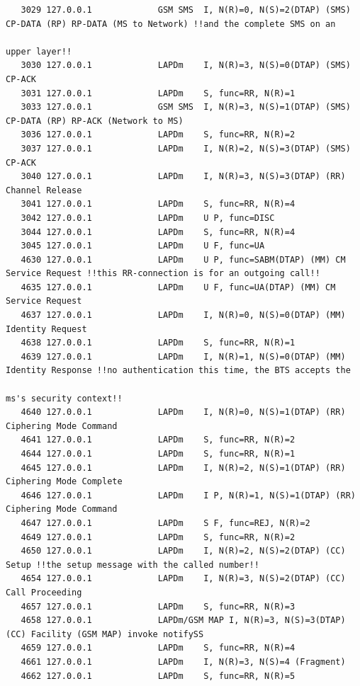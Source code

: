 \begin{lstlisting}
   3029 127.0.0.1             GSM SMS  I, N(R)=0, N(S)=2(DTAP) (SMS) CP-DATA (RP) RP-DATA (MS to Network) !!and the complete SMS on an
                                                                                                          upper layer!!
   3030 127.0.0.1             LAPDm    I, N(R)=3, N(S)=0(DTAP) (SMS) CP-ACK 
   3031 127.0.0.1             LAPDm    S, func=RR, N(R)=1
   3033 127.0.0.1             GSM SMS  I, N(R)=3, N(S)=1(DTAP) (SMS) CP-DATA (RP) RP-ACK (Network to MS)
   3036 127.0.0.1             LAPDm    S, func=RR, N(R)=2
   3037 127.0.0.1             LAPDm    I, N(R)=2, N(S)=3(DTAP) (SMS) CP-ACK 
   3040 127.0.0.1             LAPDm    I, N(R)=3, N(S)=3(DTAP) (RR) Channel Release 
   3041 127.0.0.1             LAPDm    S, func=RR, N(R)=4
   3042 127.0.0.1             LAPDm    U P, func=DISC
   3044 127.0.0.1             LAPDm    S, func=RR, N(R)=4
   3045 127.0.0.1             LAPDm    U F, func=UA
   4630 127.0.0.1             LAPDm    U P, func=SABM(DTAP) (MM) CM Service Request !!this RR-connection is for an outgoing call!!
   4635 127.0.0.1             LAPDm    U F, func=UA(DTAP) (MM) CM Service Request 
   4637 127.0.0.1             LAPDm    I, N(R)=0, N(S)=0(DTAP) (MM) Identity Request 
   4638 127.0.0.1             LAPDm    S, func=RR, N(R)=1
   4639 127.0.0.1             LAPDm    I, N(R)=1, N(S)=0(DTAP) (MM) Identity Response !!no authentication this time, the BTS accepts the
                                                                                      ms's security context!!
   4640 127.0.0.1             LAPDm    I, N(R)=0, N(S)=1(DTAP) (RR) Ciphering Mode Command 
   4641 127.0.0.1             LAPDm    S, func=RR, N(R)=2
   4644 127.0.0.1             LAPDm    S, func=RR, N(R)=1
   4645 127.0.0.1             LAPDm    I, N(R)=2, N(S)=1(DTAP) (RR) Ciphering Mode Complete 
   4646 127.0.0.1             LAPDm    I P, N(R)=1, N(S)=1(DTAP) (RR) Ciphering Mode Command 
   4647 127.0.0.1             LAPDm    S F, func=REJ, N(R)=2
   4649 127.0.0.1             LAPDm    S, func=RR, N(R)=2
   4650 127.0.0.1             LAPDm    I, N(R)=2, N(S)=2(DTAP) (CC) Setup !!the setup message with the called number!!
   4654 127.0.0.1             LAPDm    I, N(R)=3, N(S)=2(DTAP) (CC) Call Proceeding 
   4657 127.0.0.1             LAPDm    S, func=RR, N(R)=3
   4658 127.0.0.1             LAPDm/GSM MAP I, N(R)=3, N(S)=3(DTAP) (CC) Facility (GSM MAP) invoke notifySS 
   4659 127.0.0.1             LAPDm    S, func=RR, N(R)=4
   4661 127.0.0.1             LAPDm    I, N(R)=3, N(S)=4 (Fragment)
   4662 127.0.0.1             LAPDm    S, func=RR, N(R)=5

\end{lstlisting}
